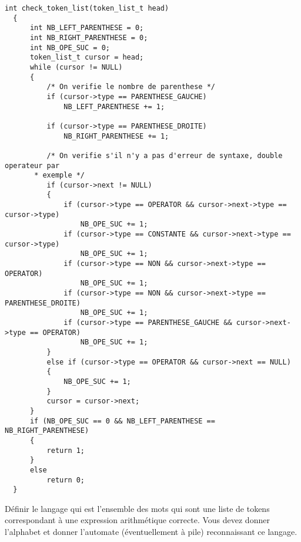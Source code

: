 \documentclass[12pt,a4paper]{article}
\begin{document}
\begin{lstlisting}[style=CStyle]
  int check_token_list(token_list_t head)
  {
      int NB_LEFT_PARENTHESE = 0;
      int NB_RIGHT_PARENTHESE = 0;
      int NB_OPE_SUC = 0;
      token_list_t cursor = head;
      while (cursor != NULL)
      {
          /* On verifie le nombre de parenthese */
          if (cursor->type == PARENTHESE_GAUCHE)
              NB_LEFT_PARENTHESE += 1;
  
          if (cursor->type == PARENTHESE_DROITE)
              NB_RIGHT_PARENTHESE += 1;
  
          /* On verifie s'il n'y a pas d'erreur de syntaxe, double operateur par                                  
       * exemple */
          if (cursor->next != NULL)
          {
              if (cursor->type == OPERATOR && cursor->next->type == cursor->type)
                  NB_OPE_SUC += 1;
              if (cursor->type == CONSTANTE && cursor->next->type == cursor->type)
                  NB_OPE_SUC += 1;
              if (cursor->type == NON && cursor->next->type == OPERATOR)
                  NB_OPE_SUC += 1;
              if (cursor->type == NON && cursor->next->type == PARENTHESE_DROITE)
                  NB_OPE_SUC += 1;
              if (cursor->type == PARENTHESE_GAUCHE && cursor->next->type == OPERATOR)
                  NB_OPE_SUC += 1;
          }
          else if (cursor->type == OPERATOR && cursor->next == NULL)
          {
              NB_OPE_SUC += 1;
          }
          cursor = cursor->next;
      }
      if (NB_OPE_SUC == 0 && NB_LEFT_PARENTHESE == NB_RIGHT_PARENTHESE)
      {
          return 1;
      }
      else
          return 0;
  }
\end{lstlisting}
\newpage
Définir le langage qui est l’ensemble des mots qui sont une liste de tokens correspondant à une expression
arithmétique correcte. Vous devez donner l’alphabet et donner l’automate (éventuellement à pile) reconnaissant
ce langage.
\end{document}
